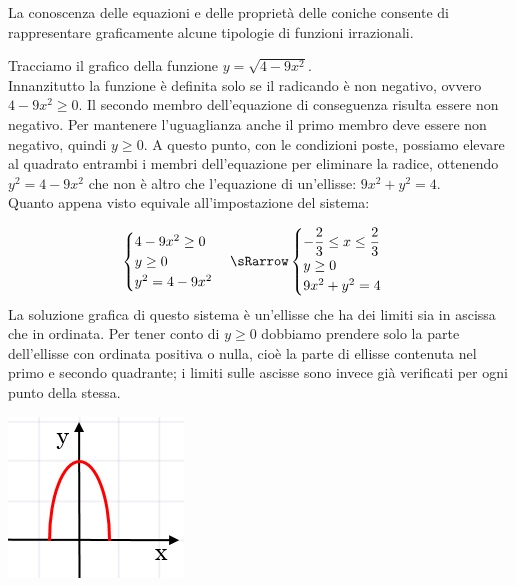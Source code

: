 La conoscenza delle equazioni e delle proprietà delle coniche consente di 
rappresentare graficamente alcune tipologie di funzioni irrazionali.\\
\begin{esempio} Tracciamo il grafico della funzione 
$y=\sqrt{4-9x^{2}}$.\\[7pt] Innanzitutto la funzione è definita solo se il 
radicando è non negativo, ovvero $4-9x^{2}\geq0$. Il secondo membro 
dell'equazione di conseguenza risulta essere non negativo. Per mantenere l'uguaglianza 
anche il primo membro deve essere non negativo, quindi $ y\geq 0 $. 
A questo punto, con le condizioni poste, possiamo elevare al quadrato entrambi i membri dell'equazione
per eliminare la radice, ottenendo $ y^{2}=4-9x^{2} $ che non è altro che 
l'equazione di un'ellisse: $ 9x^{2}+y^{2}=4 $.
\\[5pt]
Quanto appena visto equivale all'impostazione del sistema:\\[7pt]
\noindent \begin{minipage}{.7\textwidth}
\[\begin{cases}  4-9x^{2}\geq 0   \\ y\geq0  \\y^{2}=4-9x^{2} 
\end{cases} \sRarrow
\begin{cases}   -\dfrac{2}{3}\leq x\leq \dfrac{2}{3}   \\ y\geq0  \\ 
9x^{2}+y^{2}=4 \end{cases}\] 
La soluzione grafica di questo sistema è un'ellisse che ha 
dei limiti sia in ascissa che in ordinata. Per tener conto di $ y\geq0 $ 
dobbiamo prendere solo la parte dell'ellisse con ordinata positiva o nulla, 
cioè la parte di ellisse contenuta nel primo e secondo quadrante; i limiti sulle ascisse
sono invece già verificati per ogni punto della stessa.
  \end{minipage}
  \hspace{.7cm}
  \begin{minipage}{.3\textwidth}
    \includegraphics[width=.85\textwidth]{img/curva1.jpg}

\end{minipage}
\end{esempio}
